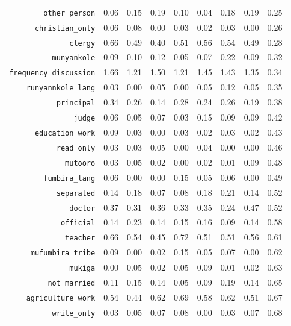 \begin{longtable}{rrrrrrrrr}
  {\texttt{other\_person}} & 0.06 & 0.15 & 0.19 & 0.10 & 0.04 & 0.18 & 0.19 & 0.25 \\ 
  {\texttt{christian\_only}} & 0.06 & 0.08 & 0.00 & 0.03 & 0.02 & 0.03 & 0.00 & 0.26 \\ 
  {\texttt{clergy}} & 0.66 & 0.49 & 0.40 & 0.51 & 0.56 & 0.54 & 0.49 & 0.28 \\ 
  {\texttt{munyankole}} & 0.09 & 0.10 & 0.12 & 0.05 & 0.07 & 0.22 & 0.09 & 0.32 \\ 
  {\texttt{frequency\_discussion}} & 1.66 & 1.21 & 1.50 & 1.21 & 1.45 & 1.43 & 1.35 & 0.34 \\ 
  {\texttt{runyannkole\_lang}} & 0.03 & 0.00 & 0.05 & 0.00 & 0.05 & 0.12 & 0.05 & 0.35 \\ 
  {\texttt{principal}} & 0.34 & 0.26 & 0.14 & 0.28 & 0.24 & 0.26 & 0.19 & 0.38 \\ 
  {\texttt{judge}} & 0.06 & 0.05 & 0.07 & 0.03 & 0.15 & 0.09 & 0.09 & 0.42 \\ 
  {\texttt{education\_work}} & 0.09 & 0.03 & 0.00 & 0.03 & 0.02 & 0.03 & 0.02 & 0.43 \\ 
  {\texttt{read\_only}} & 0.03 & 0.03 & 0.05 & 0.00 & 0.04 & 0.00 & 0.00 & 0.46 \\ 
  {\texttt{mutooro}} & 0.03 & 0.05 & 0.02 & 0.00 & 0.02 & 0.01 & 0.09 & 0.48 \\ 
  {\texttt{fumbira\_lang}} & 0.06 & 0.00 & 0.00 & 0.15 & 0.05 & 0.06 & 0.00 & 0.49 \\ 
  {\texttt{separated}} & 0.14 & 0.18 & 0.07 & 0.08 & 0.18 & 0.21 & 0.14 & 0.52 \\ 
  {\texttt{doctor}} & 0.37 & 0.31 & 0.36 & 0.33 & 0.35 & 0.24 & 0.47 & 0.52 \\ 
  {\texttt{official}} & 0.14 & 0.23 & 0.14 & 0.15 & 0.16 & 0.09 & 0.14 & 0.58 \\ 
  {\texttt{teacher}} & 0.66 & 0.54 & 0.45 & 0.72 & 0.51 & 0.51 & 0.56 & 0.61 \\ 
  {\texttt{mufumbira\_tribe}} & 0.09 & 0.00 & 0.02 & 0.15 & 0.05 & 0.07 & 0.00 & 0.62 \\ 
  {\texttt{mukiga}} & 0.00 & 0.05 & 0.02 & 0.05 & 0.09 & 0.01 & 0.02 & 0.63 \\ 
  {\texttt{not\_married}} & 0.11 & 0.15 & 0.14 & 0.05 & 0.09 & 0.19 & 0.14 & 0.65 \\ 
  {\texttt{agriculture\_work}} & 0.54 & 0.44 & 0.62 & 0.69 & 0.58 & 0.62 & 0.51 & 0.67 \\ 
  {\texttt{write\_only}} & 0.03 & 0.05 & 0.07 & 0.08 & 0.00 & 0.03 & 0.07 & 0.68 \\ 

\end{longtable}

